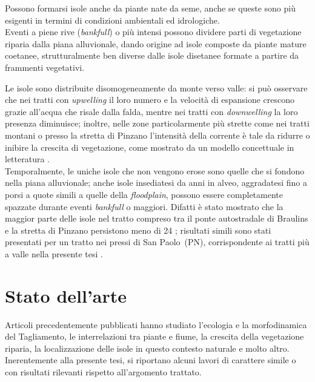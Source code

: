 Possono formarsi isole anche da piante nate da seme, anche se queste sono più esigenti in termini di condizioni ambientali ed idrologiche.
\\
Eventi a piene rive (\emph{bankfull}) o più intensi possono dividere parti di vegetazione riparia dalla piana alluvionale, dando origine ad isole composte da piante mature coetanee, strutturalmente ben diverse dalle isole disetanee formate a partire da frammenti vegetativi.

Le isole sono distribuite disomogeneamente da monte verso valle: si può osservare che nei tratti con \emph{upwelling} il loro numero e la velocità di espansione crescono grazie all'acqua che risale dalla falda, mentre nei tratti con \emph{downwelling} la loro presenza diminuisce;
inoltre, nelle zone particolarmente più strette come nei tratti montani o presso la stretta di Pinzano l'intensità della corrente è tale da ridurre o inibire la crescita di vegetazione, come mostrato da un modello concettuale in letteratura .
\\
Temporalmente, le uniche isole che non vengono erose sono quelle che si fondono nella piana alluvionale; anche isole insediatesi da anni in alveo, aggradatesi fino a porsi a quote simili a quelle della \emph{floodplain}, possono essere completamente spazzate durante eventi \emph{bankfull} o maggiori.
Difatti è stato mostrato che la maggior parte delle isole nel tratto compreso tra il ponte autostradale di Braulins e la stretta di Pinzano persistono meno di \SI{24}{\anni} ; risultati simili sono stati presentati per un tratto nei pressi di San Paolo~(PN), corrispondente ai tratti più a valle nella presente tesi .


\section{Stato dell'arte}
Articoli precedentemente pubblicati hanno studiato l'ecologia e la morfodinamica del Tagliamento, le interrelazioni tra piante e fiume, la crescita della vegetazione riparia, la localizzazione delle isole in questo contesto naturale e molto altro.
\\
Inerentemente alla presente tesi, si riportano alcuni lavori di carattere simile o con risultati rilevanti rispetto all'argomento trattato.

